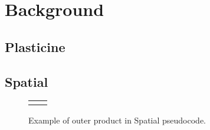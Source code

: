 \chapter{Background}

\section{Plasticine}

\section{Spatial}

\begin{figure}
\centering
\newsavebox{\outerProduct}
\begin{lrbox}{\outerProduct}

\end{lrbox}
\begin{tabular}{m{0.01cm} l} & \usebox{\outerProduct}\\ \end{tabular}
  \caption{Example of outer product in Spatial pseudocode.}
\label{fig:spatial_app}
\end{figure}

